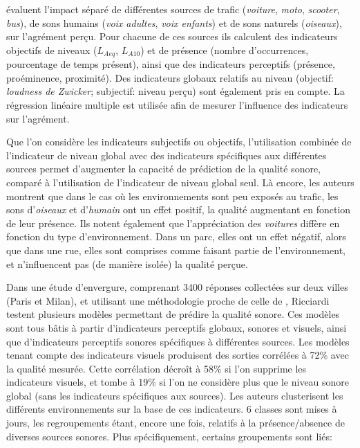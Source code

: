 \citep{defreville2004aactivity,lavandier2006contribution} évaluent l'impact séparé de différentes sources de trafic (\emph{voiture}, \emph{moto}, \emph{scooter}, \emph{bus}), de sons humains (\emph{voix adultes}, \emph{voix enfants}) et de sons naturels (\emph{oiseaux}), sur l'agrément perçu. Pour chacune de ces sources ils calculent des indicateurs objectifs de niveaux ($L_{Aeq}$, $L_{A10}$) et de présence (nombre d’occurrences, pourcentage de temps présent), ainsi que des indicateurs perceptifs (présence, proéminence, proximité). Des indicateurs globaux relatifs au niveau (objectif: \emph{loudness de Zwicker}; subjectif: niveau perçu) sont également pris en compte. La régression linéaire multiple est utilisée afin de mesurer l'influence des indicateurs sur l'agrément.

Que l'on considère les indicateurs subjectifs ou objectifs, l'utilisation combinée de l'indicateur de niveau global avec des indicateurs spécifiques aux différentes sources permet d'augmenter la capacité de prédiction de la qualité sonore, comparé à l'utilisation de l'indicateur de niveau global seul. Là encore, les auteurs montrent que dans le cas où les environnements sont peu exposés au trafic, les sons d'\emph{oiseaux} et d'\emph{humain} ont un effet positif, la qualité augmentant en fonction de leur présence. Ils notent également que l'appréciation des \emph{voitures} diffère en fonction du type d'environnement. Dans un parc, elles ont un effet négatif, alors que dans une rue, elles sont comprises comme faisant partie de l'environnement, et n'influencent pas (de manière isolée) la qualité perçue.

Dans une étude d'envergure, comprenant 3400 réponses collectées sur deux villes (Paris et Milan), et utilisant une méthodologie proche de celle de \citep{lavandier2006contribution}, Ricciardi~\al \citep{ricciardi2015sound} testent plusieurs modèles permettant de prédire la qualité sonore. Ces modèles sont tous bâtis à partir d'indicateurs perceptifs globaux, sonores et visuels, ainsi que d'indicateurs perceptifs sonores spécifiques à différentes sources. Les modèles tenant compte des indicateurs visuels produisent des sorties corrélées à 72\% avec la qualité mesurée. Cette corrélation décroît à 58\% si l'on supprime les indicateurs visuels, et tombe à 19\% si l'on ne considère plus que le niveau sonore global (sans les indicateurs spécifiques aux sources). Les auteurs clusterisent les différents environnements sur la base de ces indicateurs. 6 classes sont mises à jours, les regroupements étant, encore une fois, relatifs à la présence/absence de diverses sources sonores. Plus spécifiquement, certains groupements sont liés:

